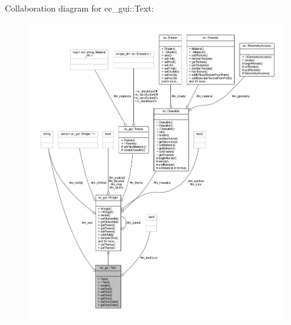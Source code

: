 Collaboration diagram for ec\+\_\+gui\+:\+:Text\+:\nopagebreak
\begin{figure}[H]
\begin{center}
\leavevmode
\includegraphics[width=350pt]{classec__gui_1_1_text__coll__graph}
\end{center}
\end{figure}
